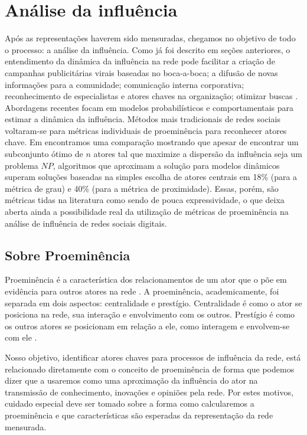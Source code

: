 \chapter{Análise da influência}
\label{ch:mineracao}

Após as representações haverem sido mensuradas, chegamos no objetivo de todo o
processo: a análise da influência. Como já foi descrito em seções anteriores, o
entendimento da dinâmica da influência na rede pode facilitar a criação de
campanhas publicitárias virais baseadas no boca-a-boca; a difusão de novas
informações para a comunidade; comunicação interna corporativa; reconhecimento de
especialistas e atores chaves na organização; otimizar buscas
\citep{Kirchhoff2009}. Abordagens recentes focam em modelos probabilísticos e
comportamentais para estimar a dinâmica da influência. Métodos mais tradicionais
de redes sociais voltaram-se para métricas individuais de proeminência para
reconhecer atores chave. Em \citet{Kempe2003} encontramos uma comparação
mostrando que apesar de encontrar um subconjunto ótimo de $n$ atores tal que
maximize a dispersão da influência seja um problema $NP$, algoritmos que
aproximam a solução para modelos dinâmicos superam soluções baseadas na simples
escolha de atores centrais em 18\% (para a métrica de grau) e 40\% (para a
métrica de proximidade). Essas, porém, são métricas tidas na literatura como
sendo de pouca expressividade, o que deixa aberta ainda a possibilidade real da
utilização de métricas de proeminência na análise de influência de redes sociais
digitais.

\section{Sobre Proeminência}
\label{sec:sobre-proem}
Proeminência é a característica dos relacionamentos de um ator que o põe em
evidência para outros atores na rede \citep{Wasserman}. A proeminência,
academicamente, foi separada em dois aspectos: centralidade e prestígio.
Centralidade é como o ator se posiciona na rede, sua interação e envolvimento com
os outros. Prestígio é como os outros atores se posicionam em relação a ele, como
interagem e envolvem-se com ele \citep{Knoke1983}.

Nosso objetivo, identificar atores chaves para processos de influência da rede,
está relacionado diretamente com o conceito de proeminência de forma que podemos
dizer que a usaremos como uma aproximação da influência do ator na transmissão de
conhecimento, inovações e opiniões pela rede. Por estes motivos, cuidado especial
deve ser tomado sobre a forma como calcularemos a proeminência e que
características são esperadas da representação da rede mensurada.

